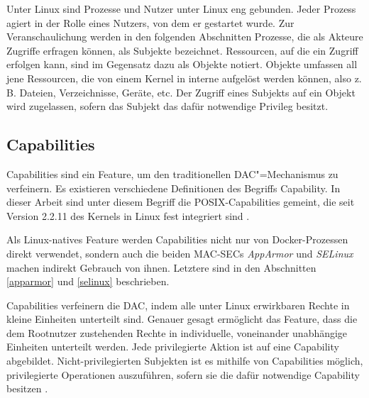 \documentclass[../main.tex]{subfiles}
\begin{document}
		Unter Linux sind Prozesse und Nutzer unter Linux eng gebunden. Jeder Prozess agiert in der Rolle eines Nutzers, von dem er gestartet wurde.	Zur Veranschaulichung werden in den folgenden Abschnitten Prozesse, die als Akteure Zugriffe erfragen können, als Subjekte bezeichnet. Ressourcen, auf die ein Zugriff erfolgen kann, sind im Gegensatz dazu als Objekte notiert. Objekte umfassen all jene Ressourcen, die von einem Kernel in interne  aufgelöst werden können, also z.\,B. Dateien, Verzeichnisse, Geräte, etc. Der Zugriff eines Subjekts auf ein Objekt wird zugelassen, sofern das Subjekt das dafür notwendige Privileg besitzt.



    \subsection{Capabilities}
		\label{capabilities}
			Capabilities sind ein Feature, um den traditionellen DAC"=Mechanismus zu verfeinern. Es existieren verschiedene Definitionen des Begriffs \glqq{}Capability\grqq{}. In dieser Arbeit sind unter diesem Begriff die \acrshort{POSIX}-Capabilities gemeint, die seit Version 2.2.11 des Kernels in Linux fest integriert sind \cite[S.42]{SELinuxApparmor}.

			Als Linux-natives Feature werden Capabilities nicht nur von Docker-Prozessen direkt verwendet, sondern auch die beiden \acrshort{MAC-SEC}s \emph{\acrshort{AppArmor}} und \emph{\acrshort{SELinux}} machen indirekt Gebrauch von ihnen. Letztere sind in den Abschnitten \ref{apparmor} und \ref{selinux} beschrieben.

			Capabilities verfeinern die DAC, indem alle unter Linux erwirkbaren Rechte in kleine Einheiten unterteilt sind. Genauer gesagt ermöglicht das Feature, dass die dem Rootnutzer zustehenden Rechte in individuelle, voneinander unabhängige Einheiten unterteilt werden. Jede privilegierte Aktion ist auf eine Capability abgebildet. Nicht-privilegierten Subjekten ist es mithilfe von Capabilities möglich, privilegierte Operationen auszuführen, sofern sie die dafür notwendige Capability besitzen \cite[S.33]{linuxInterface}\cite[S.39]{SELinuxApparmor}.
\end{document}
